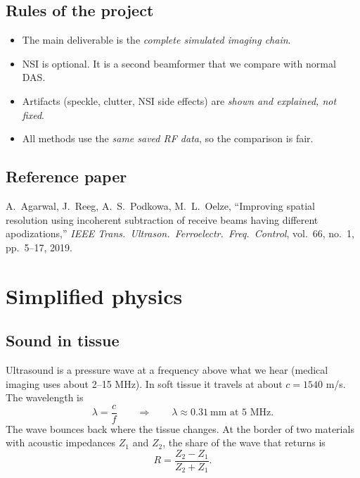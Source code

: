 \documentclass[11pt,a4paper]{article}
\begin{document}
\subsection{Rules of the project}
\begin{itemize}
\item The main deliverable is the \emph{complete simulated imaging chain}.
\item NSI is optional. It is a second beamformer that we compare with normal DAS.
\item Artifacts (speckle, clutter, NSI side effects) are \emph{shown and explained, not fixed}.
\item All methods use the \emph{same saved RF data}, so the comparison is fair.
\end{itemize}

\subsection{Reference paper}
A.~Agarwal, J.~Reeg, A.~S.~Podkowa, M.~L.~Oelze, ``Improving spatial resolution using incoherent subtraction of receive beams having different apodizations,'' \emph{IEEE Trans.\ Ultrason.\ Ferroelectr.\ Freq.\ Control}, vol.~66, no.~1, pp.~5--17, 2019.

\section{Simplified physics}

\subsection{Sound in tissue}
Ultrasound is a pressure wave at a frequency above what we hear (medical imaging uses about 2--15 MHz). In soft tissue it travels at about $c = 1540$ m/s. The wavelength is
\begin{equation}
\lambda = \frac{c}{f}\qquad\Rightarrow\qquad \lambda \approx 0.31\ \text{mm at 5 MHz.}
\end{equation}
The wave bounces back where the tissue changes. At the border of two materials with acoustic impedances $Z_1$ and $Z_2$, the share of the wave that returns is
\begin{equation}
R = \frac{Z_2 - Z_1}{Z_2 + Z_1}.
\end{equation}
\end{document}
